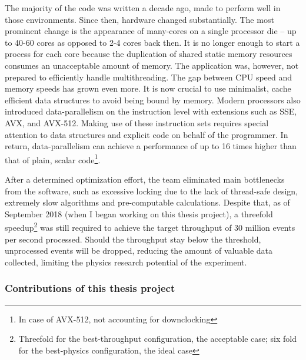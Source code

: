 \documentclass[12pt]{article}
\begin{document}
\vspace{1pc}
The majority of the code was written a decade ago, made to perform well in those environments. Since then, hardware changed substantially. The most prominent change is the appearance of many-cores on a single processor die -- up to 40-60 cores as opposed to 2-4 cores back then. It is no longer enough to start a process for each core because the duplication of shared static memory resources consumes an unacceptable amount of memory. The application was, however, not prepared to efficiently handle multithreading. The gap between CPU speed and memory speeds has grown even more. It is now crucial to use minimalist, cache efficient data structures to avoid being bound by memory. Modern processors also introduced data-parallelism on the instruction level with extensions such as SSE, AVX, and AVX-512. Making use of these instruction sets requires special attention to data structures and explicit code on behalf of the programmer. In return, data-parallelism can achieve a performance of up to 16 times higher than that of plain, scalar code\footnote{In case of AVX-512, not accounting for downclocking}.

\vspace{1pc}
After a determined optimization effort, the team eliminated main bottlenecks from the software, such as excessive locking due to the lack of thread-safe design, extremely slow algorithms and pre-computable calculations. Despite that, as of September 2018 (when I began working on this thesis project), a threefold speedup\footnote{Threefold for the best-throughput configuration, the acceptable case; six fold for the best-physics configuration, the ideal case} was still required to achieve the target throughput of 30 million events per second processed. Should the throughput stay below the threshold, unprocessed events will be dropped, reducing the amount of valuable data collected, limiting the physics research potential of the experiment.

\subsubsection{Contributions of this thesis project}
\end{document}
